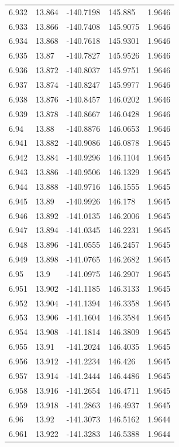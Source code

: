 \begin{tabular}{lllll}
6.932 & 13.864 & -140.7198 & 145.885 & 1.9646 \\
6.933 & 13.866 & -140.7408 & 145.9075 & 1.9646 \\
6.934 & 13.868 & -140.7618 & 145.9301 & 1.9646 \\
6.935 & 13.87 & -140.7827 & 145.9526 & 1.9646 \\
6.936 & 13.872 & -140.8037 & 145.9751 & 1.9646 \\
6.937 & 13.874 & -140.8247 & 145.9977 & 1.9646 \\
6.938 & 13.876 & -140.8457 & 146.0202 & 1.9646 \\
6.939 & 13.878 & -140.8667 & 146.0428 & 1.9646 \\
6.94 & 13.88 & -140.8876 & 146.0653 & 1.9646 \\
6.941 & 13.882 & -140.9086 & 146.0878 & 1.9645 \\
6.942 & 13.884 & -140.9296 & 146.1104 & 1.9645 \\
6.943 & 13.886 & -140.9506 & 146.1329 & 1.9645 \\
6.944 & 13.888 & -140.9716 & 146.1555 & 1.9645 \\
6.945 & 13.89 & -140.9926 & 146.178 & 1.9645 \\
6.946 & 13.892 & -141.0135 & 146.2006 & 1.9645 \\
6.947 & 13.894 & -141.0345 & 146.2231 & 1.9645 \\
6.948 & 13.896 & -141.0555 & 146.2457 & 1.9645 \\
6.949 & 13.898 & -141.0765 & 146.2682 & 1.9645 \\
6.95 & 13.9 & -141.0975 & 146.2907 & 1.9645 \\
6.951 & 13.902 & -141.1185 & 146.3133 & 1.9645 \\
6.952 & 13.904 & -141.1394 & 146.3358 & 1.9645 \\
6.953 & 13.906 & -141.1604 & 146.3584 & 1.9645 \\
6.954 & 13.908 & -141.1814 & 146.3809 & 1.9645 \\
6.955 & 13.91 & -141.2024 & 146.4035 & 1.9645 \\
6.956 & 13.912 & -141.2234 & 146.426 & 1.9645 \\
6.957 & 13.914 & -141.2444 & 146.4486 & 1.9645 \\
6.958 & 13.916 & -141.2654 & 146.4711 & 1.9645 \\
6.959 & 13.918 & -141.2863 & 146.4937 & 1.9645 \\
6.96 & 13.92 & -141.3073 & 146.5162 & 1.9644 \\
6.961 & 13.922 & -141.3283 & 146.5388 & 1.9644 \\

\end{tabular}
